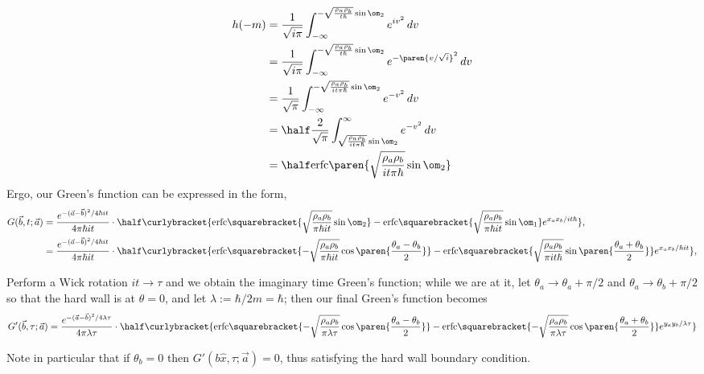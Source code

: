 \documentclass[onecolumn,amsmath,amssymb,nofootinbib,floatfix]{revtex4}
\begin{document}
$$
\begin{aligned}
h(-m)
&= \frac{1}{\sqrt{i\pi}}\int_{-\infty}^{-\sqrt{\frac{\rho_a\rho_b}{t\hbar}}\sin\om_2} e^{iv^2}\,dv \\
&= \frac{1}{\sqrt{i\pi}}\int_{-\infty}^{-\sqrt{\frac{\rho_a\rho_b}{t\hbar}}\sin\om_2} e^{-\paren{v/\sqrt{i}}^2}\,dv \\
&= \frac{1}{\sqrt{\pi}}\int_{-\infty}^{-\sqrt{\frac{\rho_a\rho_b}{it\pi\hbar}}\sin\om_2} e^{-v^2}\,dv \\
&= \half\frac{2}{\sqrt{\pi}}\int_{\sqrt{\frac{\rho_a\rho_b}{it\pi\hbar}}\sin\om_2}^{\infty} e^{-v^2}\,dv \\
&= \half\text{erfc}\paren{\sqrt{\frac{\rho_a\rho_b}{it\pi\hbar}}\sin\om_2}
\end{aligned}
$$
Ergo, our Green's function can be expressed in the form,
$$
\begin{aligned}
G(\vec{b},t;\vec{a})
& = \frac{e^{-(\vec{a}-\vec{b})^2/4\hbar it}}{4\pi \hbar it}
\cdot \half\curlybracket{\text{erfc}\squarebracket{\sqrt{\frac{\rho_a\rho_b}{\pi\hbar it}}\sin\om_2}-\text{erfc}\squarebracket{\sqrt{\frac{\rho_a\rho_b}{\pi\hbar it}}\sin\om_1} e^{x_a x_b/it\hbar}}, \\
& = \frac{e^{-(\vec{a}-\vec{b})^2/4\hbar it}}{4\pi \hbar it}
\cdot \half\curlybracket{\text{erfc}\squarebracket{-\sqrt{\frac{\rho_a\rho_b}{\pi\hbar it}}\cos\paren{\frac{\theta_a-\theta_b}{2}}}-\text{erfc}\squarebracket{\sqrt{\frac{\rho_a\rho_b}{\pi it\hbar}}\sin\paren{\frac{\theta_a+\theta_b}{2}}} e^{x_a x_b/\hbar it}}, \\
\end{aligned}
$$

Perform a Wick rotation $it\to\tau$ and we obtain the imaginary time Green's function;  while we are at it, let $\theta_a\to \theta_a+\pi/2$ and $\theta_a\to\theta_b+\pi/2$ so that the hard wall is at $\theta=0$, and let $\lambda:=\hbar/2m=\hbar$;  then our final Green's function becomes
$$G'(\vec{b},\tau;\vec{a}) = \frac{e^{-(\vec{a}-\vec{b})^2/4\lambda \tau}}{4\pi \lambda \tau}
\cdot \half\curlybracket{\text{erfc}\squarebracket{-\sqrt{\frac{\rho_a\rho_b}{\pi\lambda\tau}}\cos\paren{\frac{\theta_a-\theta_b}{2}}}-\text{erfc}\squarebracket{-\sqrt{\frac{\rho_a\rho_b}{\pi\lambda\tau}}\cos\paren{\frac{\theta_a+\theta_b}{2}}} e^{y_a y_b/\lambda\tau}}$$

Note in particular that if $\theta_b=0$ then $G'(b\hat x,\tau;\vec{a})=0$, thus satisfying the hard wall boundary condition.
\end{document}
